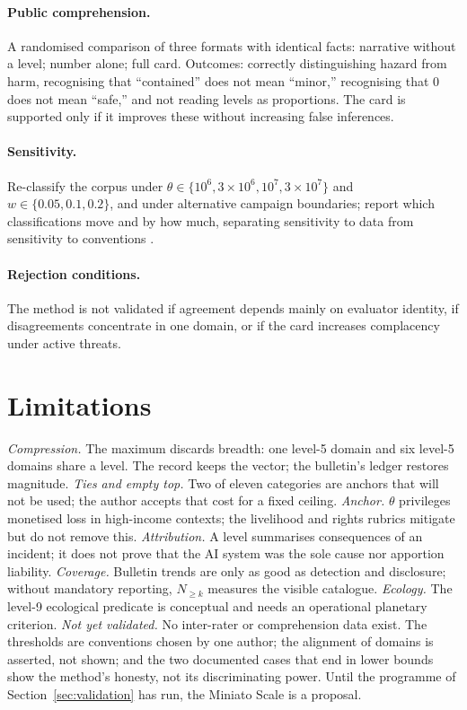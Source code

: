 \documentclass[11pt,a4paper]{article}
\newcommand{\Nk}[1]{N_{\ge #1}}
\begin{document}
\paragraph{Public comprehension.} A randomised comparison of three formats with identical facts: narrative without a level; number alone; full card. Outcomes: correctly distinguishing hazard from harm, recognising that ``contained'' does not mean ``minor,'' recognising that 0 does not mean ``safe,'' and not reading levels as proportions. The card is supported only if it improves these without increasing false inferences.

\paragraph{Sensitivity.} Re-classify the corpus under $\theta \in \{10^{6}, 3\times10^{6}, 10^{7}, 3\times10^{7}\}$ and $w \in \{0.05, 0.1, 0.2\}$, and under alternative campaign boundaries; report which classifications move and by how much, separating sensitivity to data from sensitivity to conventions \citep{oecdjrc2008}.

\paragraph{Rejection conditions.} The method is not validated if agreement depends mainly on evaluator identity, if disagreements concentrate in one domain, or if the card increases complacency under active threats.

\section{Limitations}
\label{sec:limits}

\emph{Compression.} The maximum discards breadth: one level-5 domain and six level-5 domains share a level. The record keeps the vector; the bulletin's ledger restores magnitude. \emph{Ties and empty top.} Two of eleven categories are anchors that will not be used; the author accepts that cost for a fixed ceiling. \emph{Anchor.} $\theta$ privileges monetised loss in high-income contexts; the livelihood and rights rubrics mitigate but do not remove this. \emph{Attribution.} A level summarises consequences of an incident; it does not prove that the AI system was the sole cause nor apportion liability. \emph{Coverage.} Bulletin trends are only as good as detection and disclosure; without mandatory reporting, $\Nk{k}$ measures the visible catalogue. \emph{Ecology.} The level-9 ecological predicate is conceptual and needs an operational planetary criterion. \emph{Not yet validated.} No inter-rater or comprehension data exist. The thresholds are conventions chosen by one author; the alignment of domains is asserted, not shown; and the two documented cases that end in lower bounds show the method's honesty, not its discriminating power. Until the programme of Section~\ref{sec:validation} has run, the Miniato Scale is a proposal.
\end{document}
